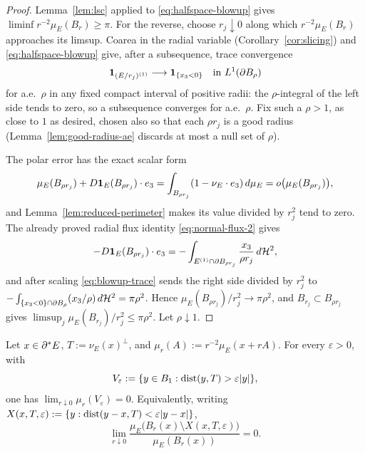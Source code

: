 \begin{proof}
Lemma~\ref{lem:lsc} applied to \eqref{eq:halfspace-blowup} gives
$\liminf r^{-2}\mu_E(B_r)\ge\pi$.  For the reverse, choose
$r_j\downarrow0$ along which $r^{-2}\mu_E(B_r)$ approaches its limsup.
Coarea in the radial variable
(Corollary~\ref{cor:slicing}) and \eqref{eq:halfspace-blowup} give, after a
subsequence, trace convergence
\begin{equation}\label{eq:blowup-trace}
  \mathbf 1_{(E/r_j)^{(1)}}\longrightarrow\mathbf 1_{\{x_3<0\}}
  \quad\text{in }L^1(\partial B_\rho)
\end{equation}
for a.e.\ $\rho$ in any fixed compact interval of positive radii: the
$\rho$-integral of the left side tends to zero, so a subsequence converges
for a.e.\ $\rho$.  Fix such a $\rho>1$, as close to $1$ as desired, chosen
also so that each $\rho r_j$ is a good radius
(Lemma~\ref{lem:good-radius-ae} discards at most a null set of $\rho$).

The polar error has the exact scalar form
\begin{equation}\label{eq:polar-error-scalar}
  \mu_E(B_{\rho r_j})+D\mathbf 1_{E}(B_{\rho r_j})\cdot e_3
  =\int_{B_{\rho r_j}}(1-\nu_E\cdot e_3)\,d\mu_E
  =o\bigl(\mu_E(B_{\rho r_j})\bigr),
\end{equation}
and Lemma~\ref{lem:reduced-perimeter} makes its value divided by $r_j^2$ tend
to zero.  The already proved radial flux identity
\eqref{eq:normal-flux-2} gives
\[
  -D\mathbf 1_{E}(B_{\rho r_j})\cdot e_3
  =-\int_{E^{(1)}\cap\partial B_{\rho r_j}}
       \frac{x_3}{\rho r_j}\,d\mathcal H^2 ,
\]
and after scaling \eqref{eq:blowup-trace} sends the right side divided by
$r_j^2$ to
$-\int_{\{x_3<0\}\cap\partial B_\rho}(x_3/\rho)\,d\mathcal H^2=\pi\rho^2$.  Hence
$\mu_E(B_{\rho r_j})/r_j^2\to\pi\rho^2$, and $B_{r_j}\subset B_{\rho r_j}$
gives $\limsup_j\mu_E(B_{r_j})/r_j^2\le\pi\rho^2$.  Let $\rho\downarrow1$.
\end{proof}

\begin{lemma}\label{lem:cone-concentration}
Let $x\in\partial^* E$, $T:=\nu_E(x)^\perp$, and
$\mu_r(A):=r^{-2}\mu_E(x+rA)$.  For every $\varepsilon>0$, with
\[
  V_\varepsilon:=\{y\in B_1:\operatorname{dist}(y,T)>\varepsilon|y|\},
\]
one has $\lim_{r\downarrow0}\mu_r(V_\varepsilon)=0$.  Equivalently, writing
$X(x,T,\varepsilon):=\{y:\operatorname{dist}(y-x,T)<\varepsilon|y-x|\}$,
\begin{equation}\label{eq:cone-concentration}
  \lim_{r\downarrow0}
  \frac{\mu_E\bigl(B_r(x)\setminus X(x,T,\varepsilon)\bigr)}{\mu_E(B_r(x))}=0 .
\end{equation}
\end{lemma}

